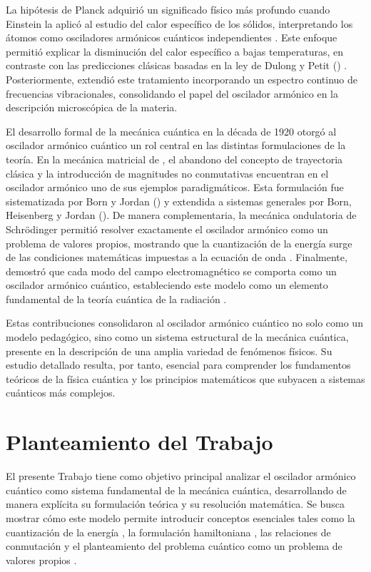     
La hipótesis de Planck adquirió un significado físico más profundo cuando Einstein la aplicó al estudio del calor específico de los sólidos, interpretando los átomos como osciladores armónicos cuánticos independientes \citep{einstein1907}. Este enfoque permitió explicar la disminución del calor específico a bajas temperaturas, en contraste con las predicciones clásicas basadas en la ley de Dulong y Petit (\citeyear{dulong1819}) . Posteriormente, \citet{debye1912} extendió este tratamiento incorporando un espectro continuo de frecuencias vibracionales, consolidando el papel del oscilador armónico en la descripción microscópica de la materia.
	
El desarrollo formal de la mecánica cuántica en la década de 1920 otorgó al oscilador armónico cuántico un rol central en las distintas formulaciones de la teoría. En la mecánica matricial de  \citet{heisenberg1925}, el abandono del concepto de trayectoria clásica y la introducción de magnitudes no conmutativas encuentran en el oscilador armónico uno de sus ejemplos paradigmáticos. Esta formulación fue sistematizada por Born y Jordan (\citeyear{born1925}) y extendida a sistemas generales por Born, Heisenberg y Jordan (\citeyear{bornheisenberg1926}). De manera complementaria, la mecánica ondulatoria de Schrödinger permitió resolver exactamente el oscilador armónico como un problema de valores propios, mostrando que la cuantización de la energía surge de las condiciones matemáticas impuestas a la ecuación de onda \citep{schrodinger1926a, schrodinger1926b}. Finalmente, \citet{dirac1927} demostró que cada modo del campo electromagnético se comporta como un oscilador armónico cuántico, estableciendo este modelo como un elemento fundamental de la teoría cuántica de la radiación .
	
Estas contribuciones consolidaron al oscilador armónico cuántico no solo como un modelo pedagógico, sino como un sistema estructural de la mecánica cuántica, presente en la descripción de una amplia variedad de fenómenos físicos\citep{manuzio_aristoteles_1497}. Su estudio detallado resulta, por tanto, esencial para comprender los fundamentos teóricos de la física cuántica y los principios matemáticos que subyacen a sistemas cuánticos más complejos\citep{dirac1930}.


\section{Planteamiento del Trabajo}
El presente Trabajo tiene como objetivo principal analizar el oscilador armónico cuántico como sistema fundamental de la mecánica cuántica, desarrollando de manera explícita su formulación teórica y su resolución matemática. Se busca mostrar cómo este modelo permite introducir conceptos esenciales tales como la cuantización de la energía \citep{schrodinger1926a, schrodinger1926b}, la formulación hamiltoniana \citep{dirac1930}, las relaciones de conmutación \citep{born1925} y el planteamiento del problema cuántico como un problema de valores propios \citep{schrodinger1926a, schrodinger1926b}.
	
